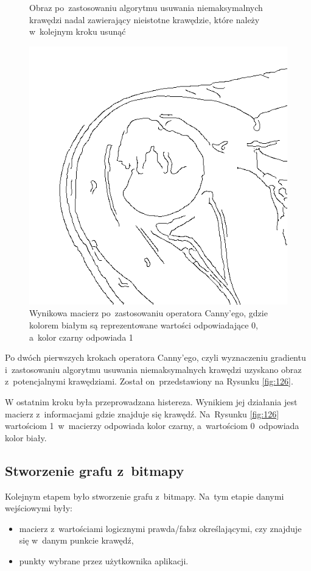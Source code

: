 \documentclass[a4paper,11pt,twoside,openright]{report}
\theoremstyle{definition}
\begin{document}
\begin{figure}[p!]
		\caption{Obraz po~zastosowaniu algorytmu usuwania
	niemaksymalnych krawędzi nadal zawierający nieistotne krawędzie, które należy
	w~kolejnym kroku usunąć}
		\label{fig:126}
	\endminipage\hfill
		\includegraphics[width=\linewidth]{127}
		\caption{Wynikowa macierz po~zastosowaniu
	operatora Canny'ego, gdzie kolorem białym są
	reprezentowane wartości odpowiadające 0, a~kolor czarny odpowiada 1}
		\label{fig:127}
	\endminipage\hfill
\end{figure}

Po dwóch pierwszych krokach operatora Canny'ego, czyli wyznaczeniu gradientu i~zastosowaniu algorytmu
usuwania niemaksymalnych krawędzi uzyskano obraz z~potencjalnymi krawędziami. Został on~przedstawiony
na Rysunku \ref{fig:126}.

W ostatnim kroku była przeprowadzana histereza. Wynikiem jej działania jest macierz z~informacjami
gdzie znajduje się krawędź. Na~Rysunku \ref{fig:126} wartościom 1~w~macierzy odpowiada kolor czarny,
a~wartościom 0~odpowiada kolor biały.

\subsection {Stworzenie grafu z~bitmapy}

Kolejnym etapem było stworzenie grafu z~bitmapy. Na~tym etapie danymi wejściowymi były:
\begin{itemize}[noitemsep]
\item macierz z~wartościami logicznymi prawda/fałsz określającymi, czy znajduje się w~danym
punkcie krawędź,
\item punkty wybrane przez użytkownika aplikacji.
\end{itemize}
\end{document}
